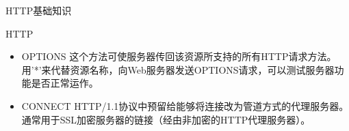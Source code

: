 \documentclass{beamer}
\begin{document}
\begin{frame}[t]{HTTP基础知识}
    \begin{block}
        {HTTP}
        \begin{itemize}
            \item OPTIONS 这个方法可使服务器传回该资源所支持的所有HTTP请求方法。用'*'来代替资源名称，向Web服务器发送OPTIONS请求，可以测试服务器功能是否正常运作。
            \item CONNECT HTTP/1.1协议中预留给能够将连接改为管道方式的代理服务器。通常用于SSL加密服务器的链接（经由非加密的HTTP代理服务器）。
        \end{itemize}
    \end{block}
    
\end{frame}
% 
% 
%         
%     
% 
% 
%         
%     
% 
%     
\end{document}
